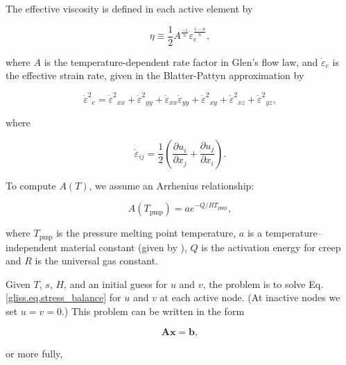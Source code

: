 The effective viscosity is defined in each active element by

\begin{equation}
  \label{gliss.eq.effective_viscosity}
  \eta \equiv \frac{1}{2} A^{\frac{-1}{n}} \dot{\varepsilon }_{e}^{\frac{1-n}{n}},
\end{equation}

\noindent
where $A$ is the temperature-dependent rate factor in Glen's flow law, and $\dot{\varepsilon }_{e}$ is the effective strain rate,
given in the Blatter-Pattyn approximation by 

\begin{equation}
  \label{gliss.eq.effective_strain_rate}
        {{\dot{\varepsilon }}^{2}}_{e}={{\dot{\varepsilon }}^{2}}_{xx}+{{\dot{\varepsilon }}^{2}}_{yy}+{{\dot{\varepsilon }}_{xx}}{{\dot{\varepsilon }}_{yy}}+{{\dot{\varepsilon }}^{2}}_{xy}+{{\dot{\varepsilon }}^{2}}_{xz}+{{\dot{\varepsilon }}^{2}}_{yz},
\end{equation}

\noindent
where

\begin{equation}
  \dot{\varepsilon }_{ij} = \frac{1}{2}\left( \frac{\partial u_{i}}{\partial x_{j}} + \frac{\partial u_{j}}{\partial x_{i}} \right).
\end{equation}

\noindent
To compute $A(T)$, we assume an Arrhenius relationship:

\begin{equation}
  \label{gliss.eq.arrhenius}
  A(T_{\mathrm{pmp}})=a e^{-Q/RT_{\mathrm{pmp}}},
\end{equation}

\noindent
where $T_{\mathrm{pmp}}$ is the pressure melting point temperature,
$a$ is a temperature--independent material constant (given by \citet{PatersonBudd:1982}),
$Q$ is the activation energy for creep and $R$ is the universal gas constant.

Given $T$, $s$, $H$, and an initial guess for $u$ and $v$, the problem is to solve Eq. \eqref{gliss.eq.stress_balance}
for $u$ and $v$ at each active node.  (At inactive nodes we set $u=v=0$.)  This problem can be written in the form

\begin{equation}
  \label{gliss.eq.matrix_full}
  \mathbf{A} \mathbf{x} = \mathbf{b},
\end{equation}

\noindent
or more fully,

